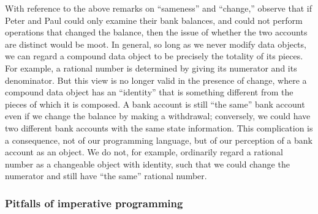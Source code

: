 With reference to the above remarks on “sameness”  and  “change,” observe that if Peter and Paul could only examine their bank balances, and could not perform operations that changed the balance, then the issue of whether the two accounts are distinct would be moot.
In general, so long as we never modify data objects, we can regard a compound data object to be precisely the totality of its pieces.
For example, a rational number is determined by giving its numerator and its denominator.
But this view is no longer valid in the presence of change, where a compound data object has an “identity” that is something different from the pieces of which it is composed.
A bank account is still “the same” bank account even if we change the balance by making a withdrawal;
conversely, we could have two different bank accounts with the same state information.
This complication is a consequence, not of our programming language, but of our perception of a bank account as an object.
We do not, for example, ordinarily regard a rational number as a changeable object with identity, such that we could change the numerator and still have “the same” rational number.



\subsubsection*{Pitfalls of imperative programming}


